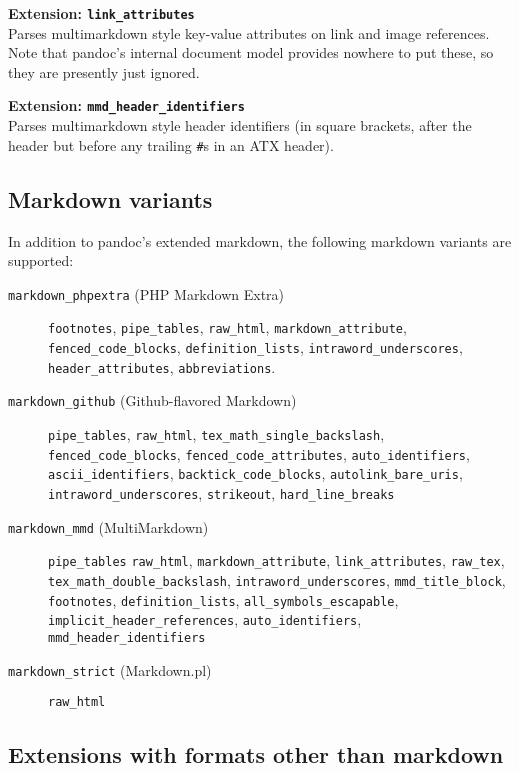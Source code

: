 \documentclass[]{article}
\begin{document}
\textbf{Extension: \texttt{link\_attributes}}\\Parses multimarkdown
style key-value attributes on link and image references. Note that
pandoc's internal document model provides nowhere to put these, so they
are presently just ignored.

\textbf{Extension: \texttt{mmd\_header\_identifiers}}\\Parses
multimarkdown style header identifiers (in square brackets, after the
header but before any trailing \texttt{\#}s in an ATX header).

\subsection{Markdown variants}

In addition to pandoc's extended markdown, the following markdown
variants are supported:

\begin{description}
\item[\texttt{markdown\_phpextra} (PHP Markdown Extra)]
\texttt{footnotes}, \texttt{pipe\_tables}, \texttt{raw\_html},
\texttt{markdown\_attribute}, \texttt{fenced\_code\_blocks},
\texttt{definition\_lists}, \texttt{intraword\_underscores},
\texttt{header\_attributes}, \texttt{abbreviations}.
\item[\texttt{markdown\_github} (Github-flavored Markdown)]
\texttt{pipe\_tables}, \texttt{raw\_html},
\texttt{tex\_math\_single\_backslash}, \texttt{fenced\_code\_blocks},
\texttt{fenced\_code\_attributes}, \texttt{auto\_identifiers},
\texttt{ascii\_identifiers}, \texttt{backtick\_code\_blocks},
\texttt{autolink\_bare\_uris}, \texttt{intraword\_underscores},
\texttt{strikeout}, \texttt{hard\_line\_breaks}
\item[\texttt{markdown\_mmd} (MultiMarkdown)]
\texttt{pipe\_tables} \texttt{raw\_html}, \texttt{markdown\_attribute},
\texttt{link\_attributes}, \texttt{raw\_tex},
\texttt{tex\_math\_double\_backslash}, \texttt{intraword\_underscores},
\texttt{mmd\_title\_block}, \texttt{footnotes},
\texttt{definition\_lists}, \texttt{all\_symbols\_escapable},
\texttt{implicit\_header\_references}, \texttt{auto\_identifiers},
\texttt{mmd\_header\_identifiers}
\item[\texttt{markdown\_strict} (Markdown.pl)]
\texttt{raw\_html}
\end{description}

\subsection{Extensions with formats other than markdown}
\end{document}

